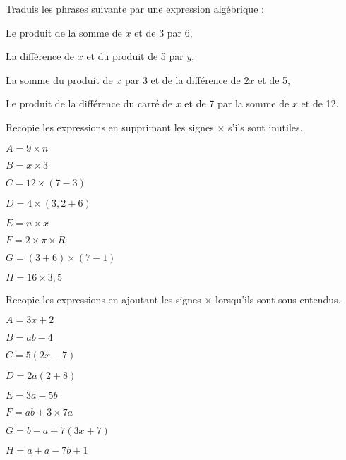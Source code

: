 \begin{exercice}
Traduis les phrases suivante par une expression algébrique :

\begin{colenumerate}{1} 
\item Le produit de la somme de $x$ et de 3 par 6,
\item La différence de $x$ et du produit de 5 par $y$,
\item La somme du produit de $x$ par 3 et de la différence de $2x$ et de 5,
\item Le produit de la différence du carré de $x$ et de 7 par la somme de $x$ et de 12.
\end{colenumerate} 
 
\end{exercice}








\begin{exercice}
Recopie les expressions en supprimant les signes $\times$ s'ils sont inutiles.
\begin{colenumerate}{2}
\item $A = 9 \times n$
\item $B = x \times 3$
\item $C = 12 \times (7 - 3)$
\item $D = 4 \times (3,2 + 6)$
\item $E = n \times x$
\item $F = 2 \times \pi \times R$
\item $G = (3 + 6) \times (7 - 1)$
\item $H = 16 \times 3,5$
\end{colenumerate}
\end{exercice}




\begin{exercice}
Recopie les expressions en ajoutant les signes $\times$ lorsqu'ils sont sous-entendus.

\begin{colenumerate}{2}
\item $A = 3x + 2$
\item $B = ab - 4$
\item $C = 5(2x - 7)$
\item $D = 2a(2 + 8)$
\item $E = 3a - 5b$
\item $F = ab + 3 \times 7a$
\item $G = b - a + 7(3x + 7)$
\item $H = a + a - 7b + 1$
\end{colenumerate}
\end{exercice}



